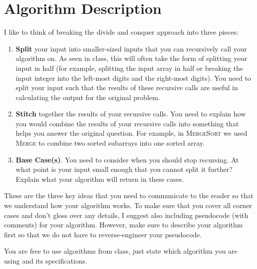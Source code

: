 \documentclass[11pt]{article}
\begin{document}
\section{Algorithm Description}
I like to think of breaking the divide and conquer approach into three pieces:
\begin{enumerate}
    \item \textbf{Split} your input into smaller-sized inputs that you can recursively call your algorithm on. As seen in class, this will often take the form of splitting your input in half (for example, splitting the input array in half or breaking the input integer into the left-most digits and the right-most digits). You need to split your input such that the results of these recursive calls are useful in calculating the output for the original problem.
    \item \textbf{Stitch} together the results of your recursive calls. You need to explain how you would combine the results of your recursive calls into something that helps you answer the original question. For example, in \textsc{MergeSort} we used \textsc{Merge} to combine two sorted subarrays into one sorted array.
    \item \textbf{Base Case(s)}. You need to consider when you should stop recursing. At what point is your input small enough that you cannot split it further? Explain what your algorithm will return in these cases.
\end{enumerate}
These are the three key ideas that you need to communicate to the reader so that we understand how your algorithm works. To make sure that you cover all corner cases and don't gloss over any details, I suggest also including pseudocode (with comments) for your algorithm. However, make sure to describe your algorithm first so that we do not have to reverse-engineer your pseudocode.

\noindent
You are free to use algorithms from class, just state which algorithm you are using and its specifications.
\end{document}
